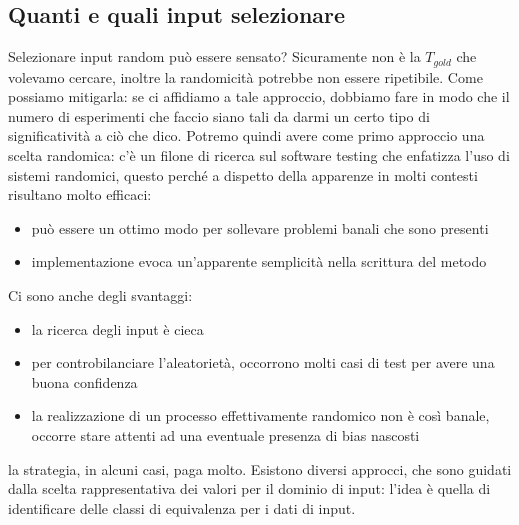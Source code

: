\documentclass{article}
\begin{document}
\subsection{Quanti e quali input selezionare}
Selezionare input random può essere sensato? Sicuramente non è la $T_{gold}$ che volevamo cercare, inoltre la randomicità potrebbe non essere ripetibile. Come possiamo mitigarla: se ci affidiamo a tale approccio, dobbiamo fare in modo che il numero di esperimenti che faccio siano tali da darmi un certo tipo di significatività a ciò che dico. Potremo quindi avere come primo approccio una scelta randomica: c'è un filone di ricerca sul software testing che enfatizza l'uso di sistemi randomici, questo perché a dispetto della apparenze in molti contesti risultano molto efficaci:
\begin{itemize}
\item può essere un ottimo modo per sollevare problemi banali che sono presenti
\item implementazione evoca un'apparente semplicità nella scrittura del metodo
\end{itemize}
Ci sono anche degli svantaggi:
\begin{itemize}
\item la ricerca degli input è cieca
\item per controbilanciare l'aleatorietà, occorrono molti casi di test per avere una buona confidenza
\item la realizzazione di un processo effettivamente randomico non è così banale, occorre stare attenti ad una eventuale presenza di bias nascosti
\end{itemize}
la strategia, in alcuni casi, paga molto. Esistono diversi approcci, che sono guidati dalla scelta rappresentativa dei valori per il dominio di input: l'idea è quella di identificare delle classi di equivalenza per i dati di input.
\end{document}
